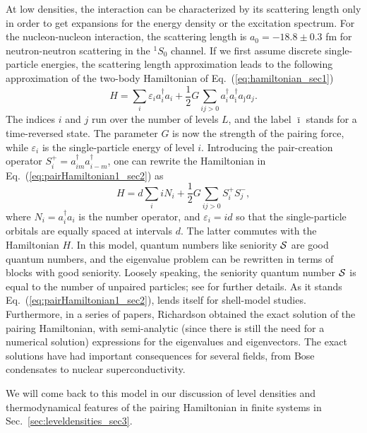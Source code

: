 \documentclass[rmp,aps,floatfix]{revtex4}
\begin{document}
At low densities, the interaction can be characterized by its 
scattering length only in order to get expansions for the energy
density or the excitation spectrum. For the nucleon-nucleon
interaction, the 
scattering length is 
$a_0=-18.8\pm 0.3$ fm for  
neutron-neutron scattering in the $^1S_0$ channel.
If we first assume discrete single-particle
energies, 
the scattering length approximation leads to the following
approximation of the two-body
Hamiltonian of Eq.~(\ref{eq:hamiltonian_sec1}) 
\begin{equation}
   H=\sum_i \varepsilon_i a^{\dagger}_i a_i +\frac{1}{2} G\sum_{ij>0}
           a^{\dagger}_{i}
     a^{\dagger}_{\bar{\imath}}a_{\bar{\jmath}}a_{j}.
     \label{eq:pairHamiltonian1_sec2}
\end{equation}
The indices $i$ and $j$ run 
over the number of levels $L$, and the label $\bar{\imath}$ stands 
for a time-reversed state. The parameter $G$ is now the 
strength of the pairing force, while $\varepsilon_i$ is the single-particle 
energy of level $i$. 
Introducing the pair-creation operator 
$S^+_i=a^{\dagger}_{im}a^{\dagger}_{i-m}$,
one can rewrite the Hamiltonian in 
Eq.\ (\ref{eq:pairHamiltonian1_sec2}) as
\begin{equation}
   H=d\sum_iiN_i+
     \frac{1}{2} G\sum_{ij>0}S^+_iS^-_j,
     \label{eq:pairH2_sec}
\end{equation}
where  $N_i=a^{\dagger}_i a_i$
is the number operator, and 
$\varepsilon_i = id$ so that the single-particle orbitals 
are equally spaced at intervals $d$. The latter commutes with the 
Hamiltonian $H$. In this model, quantum numbers like seniority 
$\cal{S}$ are good quantum numbers, and the eigenvalue problem 
can be rewritten in terms of blocks with good seniority. Loosely 
speaking, the seniority quantum number $\cal{S}$ is equal to 
the number of unpaired particles; see  \cite{talmi93} for 
further details. As it stands 
Eq.~(\ref{eq:pairHamiltonian1_sec2}), lends itself for shell-model
studies. 
Furthermore, in  a series of papers, Richardson 
\cite{richardson1,richardson2,richardson3,richardson4,richardson5,richardson6,richardson7} obtained the exact solution of the pairing Hamiltonian, with 
semi-analytic (since there is still the need for a numerical solution) 
expressions for the eigenvalues and eigenvectors. The exact solutions
have had important consequences for several fields, from Bose condensates to
nuclear superconductivity.
 
We will come back to this model 
in our discussion of level densities
and thermodynamical features of the pairing Hamiltonian in
finite systems in Sec.~\ref{sec:leveldensities_sec3}. 
\end{document}
